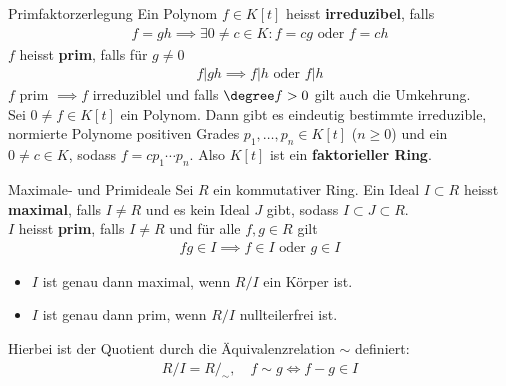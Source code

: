 \begin{satz}{Primfaktorzerlegung}
    Ein Polynom $f \in K[t]$ heisst \textbf{irreduzibel}, falls 
    \begin{align*}
        f = gh \implies \exists 0 \neq c \in K: f = cg \text{ oder } f = ch
    \end{align*}
    $f$ heisst \textbf{prim}, falls für $g \neq 0$ 
    \begin{align*}
        f| gh \implies f|h \text{ oder } f|h
    \end{align*}
    $f$ prim $\implies f$ irreduziblel und falls $\degree f > 0$ gilt auch die Umkehrung.\\
    Sei $0 \neq f \in K[t]$ ein Polynom. Dann gibt es eindeutig bestimmte irreduzible, normierte Polynome positiven Grades $p_1, \ldots, p_n \in K[t]$ ($n \geq 0$) und ein $0 \neq c \in K$, sodass $f = c p_1 \cdots p_n$. Also $K[t]$ ist ein \textbf{faktorieller Ring}.
\end{satz}

\begin{lemma}{Maximale- und Primideale}
    Sei $R$ ein kommutativer Ring. Ein Ideal $I \subset R$ heisst \textbf{maximal}, falls $I \neq R$ und es kein Ideal $J$ gibt, sodass $I \subset J \subset R$.\\
    $I$ heisst \textbf{prim}, falls $I \neq R$ und für alle $f,g \in R$ gilt 
    \begin{align*}
        fg \in I \implies f \in I \text{ oder } g \in I
    \end{align*}
    \begin{itemize}
        \item   $I$ ist genau dann maximal, wenn $R/I$ ein Körper ist.
        \item   $I$ ist genau dann prim, wenn $R/I$ nullteilerfrei ist.
    \end{itemize}
    Hierbei ist der Quotient durch die Äquivalenzrelation $\sim$ definiert:
    \begin{align*}
        R/I = R/_{\sim}, \quad f \sim g \Leftrightarrow f - g \in I
    \end{align*}
\end{lemma}


